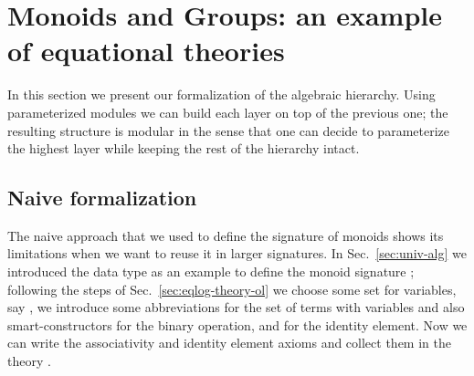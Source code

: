 \section{Monoids and Groups: an example of equational theories}
\label{sec:extheories}

In this section we present our formalization of the algebraic
hierarchy. Using parameterized modules we can build each layer on top
of the previous one; the resulting structure is modular in the sense
that one can decide to parameterize the highest layer while keeping
the rest of the hierarchy intact.

\subsection{Naive formalization}

The naive approach that we used to define the signature of monoids
shows its limitations when we want to reuse it in larger signatures.
In Sec.~\ref{sec:univ-alg} we introduced the data type
 as an example to define the monoid signature
; following the steps of
Sec.~\ref{sec:eqlog-theory-ol} we choose some set for variables, say
\AgdaSpace{} \AgdaSymbol{:}\AgdaSpace{}
 , we introduce some
abbreviations for the set of terms with variables
\AgdaSpace{} \AgdaSymbol{=}\AgdaSpace{}
 \AgdaSpace{} \AgdaSpace{}
 and also
smart-constructors
\AgdaUnderscore{}\AgdaUnderscore{} for
the binary operation, and  for the identity element.
Now we can write the associativity and identity element axioms and
collect them in the theory .

